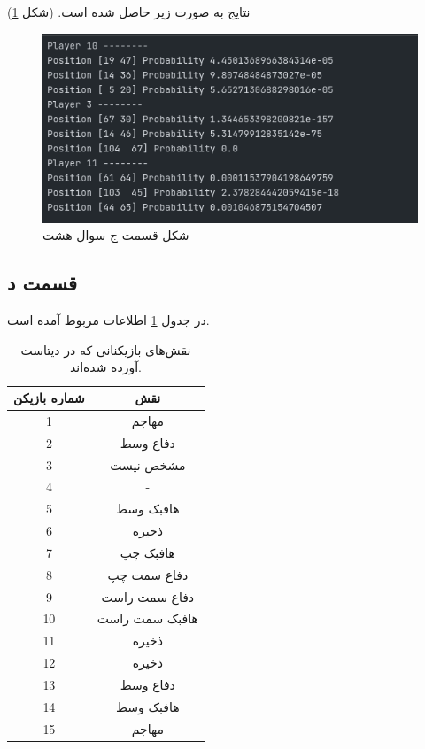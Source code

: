 \documentclass[14pt,a4]{article}
\begin{document}
نتایج به صورت زیر حاصل شده است. (شکل \ref{randomly-selected-players-and-corresponding-probability})

\begin{figure}[h]
    \centering
    \includegraphics[scale=0.25]{images/q6/partc.png}
    \caption{شکل قسمت ج سوال هشت}
    \label{randomly-selected-players-and-corresponding-probability}
\end{figure}

\subsection*{قسمت د}

در جدول \ref{role-of-the-players} اطلاعات مربوط آمده است.

\begin{table}[h]
    \centering
    \caption{نقش‌های بازیکنانی که در دیتاست آورده شده‌اند.}
    \label{role-of-the-players}
    \begin{tabular}{c|c}
        شماره بازیکن & نقش \\
        \hline
        1 & مهاجم\\
        2 & دفاع وسط\\
        3 & مشخص نیست\\
        4 & -\\
        5 & هافبک وسط\\
        6 & ذخیره\\
        7 & هافبک چپ\\
        8 & دفاع سمت چپ \\
        9 & دفاع سمت راست\\
        10 & هافبک سمت راست\\
        11 & ذخیره\\
        12 & ذخیره\\
        13 & دفاع وسط\\
        14 & هافبک وسط\\
        15 & مهاجم
    \end{tabular}
\end{table}
\end{document}
